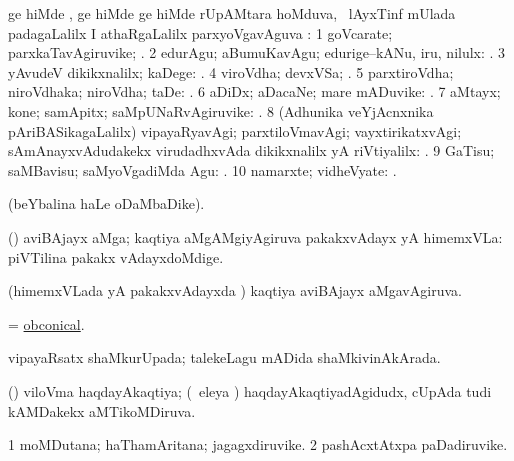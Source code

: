 \bentry
{}
\gl{\pUparx}
\bmng
{} ge hiMde ,  ge hiMde  ge hiMde  rUpAMtara hoMduva, \kanmu\ lAyxTinf mUlada padagaLalilx I athaRgaLalilx parxyoVgavAguva \pUparx: 
\bnum
\num{1} goVcarate; parxkaTavAgiruvike; . 
\num{2} edurAgu; aBumuKavAgu; edurige--kANu, iru, nilulx: . 
\num{3} yAvudeV dikikxnalilx; kaDege: . 
\num{4} viroVdha; devxVSa; . 
\num{5} parxtiroVdha; niroVdhaka; niroVdha; taDe: . 
\num{6} aDiDx; aDacaNe; mare mADuvike: . 
\num{7} aMtayx; kone; samApitx; saMpUNaRvAgiruvike: . 
\num{8} (Adhunika veYjAcnxnika pAriBASikagaLalilx) vipayaRyavAgi; parxtiloVmavAgi; vayxtirikatxvAgi; sAmAnayxvAdudakekx virudadhxvAda dikikxnalilx yA riVtiyalilx: . 
\num{9} GaTisu; saMBavisu; saMyoVgadiMda Agu: . 
\num{10} namarxte; vidheVyate: . 
\enum
\emng
\eentry

\bentry
{}
\gl{\saMkiSx}
\bmng
{} (beYbalina haLe oDaMbaDike). 
\emng
\eentry

\bentry
{}
\gl{\nA}
\bmng
(\saM) aviBAjayx aMga; kaqtiya aMgAMgiyAgiruva pakakxvAdayx yA himemxVLa:  piVTilina pakakx vAdayxdoMdige. 
\emng
\eentry

\bentry
{}
\gl{\gu}
\bmng
(himemxVLada yA pakakxvAdayxda \vi) kaqtiya aviBAjayx aMgavAgiruva. 
\emng
\eentry

\bentry
{}
\gl{\gu}
\bmng
= \hyperlink{obconical}{obconical}. 
\emng
\eentry

\bentry
{}
\gl{\gu}
\bmng
vipayaRsatx shaMkurUpada; talekeLagu mADida shaMkivinAkArada. 
\emng
\eentry

\bentry
{}
\gl{\gu}
\bmng
(\jiVvi) viloVma haqdayAkaqtiya; (\sA\ eleya \vi) haqdayAkaqtiyadAgidudx, cUpAda tudi kAMDakekx aMTikoMDiruva. 
\emng
\eentry

\bentry
{}
\gl{\nA}
\bmng
\bnum
\num{1} moMDutana; haThamAritana; jagagxdiruvike. 
\num{2} pashAcxtAtxpa paDadiruvike. 
\enum
\emng
\eentry

